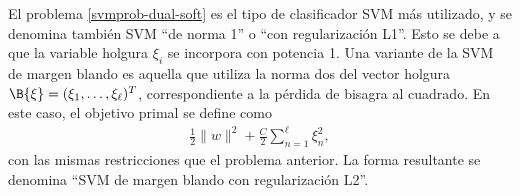 El problema \ref{svmprob-dual-soft} es el tipo de clasificador SVM más
utilizado, y se denomina también SVM ``de norma 1'' o ``con
regularización L1''.
Esto se debe a que la variable holgura $\xi_i$ se incorpora con
potencia 1.
Una variante de la SVM de margen blando es aquella que utiliza la
norma dos del vector holgura $\B{\xi}=(\xi_1,\ldots,\xi_\ell)^T$,
correspondiente a la pérdida de bisagra al cuadrado.
En este caso, el objetivo primal se define como
%
\begin{align}\label{svm-l2}
  \frac{1}{2}\|w\|^2+\frac{C}{2}\sum_{n=1}^{\ell}\xi_n^2,
\end{align}
%
con las mismas restricciones que el problema anterior.
La forma resultante se denomina ``SVM de margen blando con
regularización L2''.
